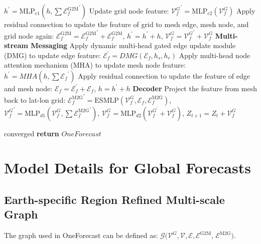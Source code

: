 \begin{algorithm}[ht]
\begin{algorithmic}[1]
                $h^{\prime} = \mathrm{MLP}_{e1}(h, \sum{\mathcal{E}^{\mathrm{G}2\mathrm{M}}_f}^{\prime})$
                \STATE Update grid node feature: ${\mathcal{V}_f^G}^{\prime} = \mathrm{MLP}_{e2}(\mathcal{V}_f^G)$
                \STATE Apply residual connection to update the feature of grid to mesh edge, mesh node, and grid node again: ${\mathcal{E}^{\mathrm{G} 2 \mathrm{M}}_f} = {\mathcal{E}^{\mathrm{G} 2 \mathrm{M}}_f}^{\prime} + {\mathcal{E}^{\mathrm{G} 2 \mathrm{M}}_f}$, $h^{\prime} = h^{\prime} + h$, ${\mathcal{V}_f^G} = {\mathcal{V}_f^G}^{\prime} + {\mathcal{V}_f^G}$
                \STATE \textbf{Multi-stream Messaging}
                \STATE Apply dynamic multi-head gated edge update module (DMG) to update edge feature: $\mathcal{E}_f^{\prime} = DMG(\mathcal{E}_f, h_s, h_r)$
                \STATE Apply multi-head node attention mechanism (MHA) to update mesh node feature: $h^{\prime} = MHA(h, \sum{\mathcal{E}_f}^{\prime})$
                \STATE Apply residual connection to update the feature of edge and mesh node: $\mathcal{E}_f = \mathcal{E}_f^{\prime} + \mathcal{E}_f$, $h = h^{\prime} + h$
                \STATE \textbf{Decoder} Project the feature from mesh back to lat-lon grid: ${\mathcal{E}^{\mathrm{M} 2 \mathrm{G}}_f}^{\prime} = \mathrm{ESMLP}(\mathcal{V}_f^G, \mathcal{E}_f, \mathcal{E}^{\mathrm{M} 2 \mathrm{G}}_f)$, ${\mathcal{V}_f^G}^{\prime} = {\mathrm{MLP}_{d1}}(\mathcal{V}_f^G, \sum{\mathcal{E}^{\mathrm{M} 2 \mathrm{G}}_f}^{\prime})$, $\mathcal{V}_f^G={\mathrm{MLP}}_{d2}(\mathcal{V}_f^{G^{\prime}}+\mathcal{V}_f^G)$, $Z_{t+1} = Z_{t} + {\mathcal{V}_f^G}$
                
                \UNTIL converged
                \STATE \textbf{return} $OneForecast$
            \end{algorithmic}
        \end{algorithm}


\section{Model Details for Global Forecasts}
\label{Appendix:model_details}

\subsection{ Earth-specific Region Refined Multi-scale Graph}
    The graph used in OneForecast can be defined as: $\mathcal{G}(\mathcal{V}^G,\mathcal{V}, \mathcal{E}, \mathcal{E}^{\mathrm{G} 2 \mathrm{M}}$, $\mathcal{E}^{\mathrm{M} 2 \mathrm{G}})$.

